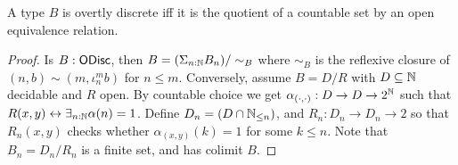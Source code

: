 
\begin{lemma}\label{OdiscQuotientCountableByOpen}
  A type $B$ is overtly discrete iff it is the quotient of a countable set by an open equivalence relation. 
\end{lemma}
\begin{proof}
  Is $B:\mathsf{ODisc}$, then $B= (\Sigma_{n:\mathbb{N}} B_n)/\sim_B$ where $\sim_B$ is the reflexive closure of  
  $(n,b)\sim(m,\iota_n^m b)$ for $n\leq m$. 
%
  Conversely, assume $B= D/R$ with $D\subseteq \mathbb{N}$ decidable and $R$ open. 
  By countable choice we get $\alpha_{(\cdot,\cdot)}:D \to D \to 2^{\mathbb{N}}$ such that 
  $R(x,y)\leftrightarrow \exists_{n:\mathbb{N}}\alpha(n) = 1$. 
  Define $D_n = (D \cap \mathbb{N}_{\leq n})$, and $R_n : D_n \to D_n \to 2$ so that $R_n(x,y)$ checks whether
  $\alpha_{(x,y)}(k) =1$ for some $k\leq n$. 
  Note that $B_n = D_n/R_n$ is a finite set, and has colimit $B$. 
\end{proof}

